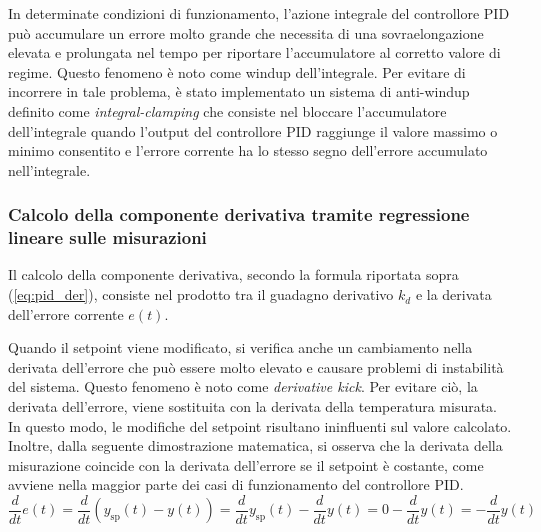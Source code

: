 In determinate condizioni di funzionamento, l'azione integrale del controllore PID può accumulare un errore molto grande che
necessita di una sovraelongazione elevata e prolungata nel tempo per riportare l'accumulatore al corretto valore di regime.
Questo fenomeno è noto come windup dell'integrale. Per evitare di incorrere in tale problema, è stato implementato un sistema
di anti-windup definito come \textit{integral-clamping} che consiste nel bloccare l'accumulatore dell'integrale quando l'output
del controllore PID raggiunge il valore massimo o minimo consentito e l'errore corrente ha lo stesso segno dell'errore accumulato
nell'integrale. \cite{advanced_pid_control} \cite{brettbeauregard_windup}

\subsubsection{Calcolo della componente derivativa tramite regressione lineare sulle misurazioni}
Il calcolo della componente derivativa, secondo la formula riportata sopra (\autoref{eq:pid_der}), consiste nel prodotto tra il guadagno
derivativo \(k_d\) e la derivata dell'errore corrente \(e(t)\).

Quando il setpoint viene modificato, si verifica anche un cambiamento nella derivata dell'errore che può essere molto elevato e causare
problemi di instabilità del sistema. Questo fenomeno è noto come \textit{derivative kick}. Per evitare ciò, la derivata dell'errore, viene
sostituita con la derivata della temperatura misurata. In questo modo, le modifiche del setpoint risultano ininfluenti sul valore calcolato.
Inoltre, dalla seguente dimostrazione matematica, si osserva che la derivata della misurazione coincide con la derivata dell'errore se il
setpoint è costante, come avviene nella maggior parte dei casi di funzionamento del controllore PID. \cite{advanced_pid_control}
\cite{brettbeauregard_derivative_kick}
\begin{equation}
	\frac{d}{dt} e(t) = \frac{d}{dt} \left(y_\text{sp}(t) - y(t) \right) = \frac{d}{dt} y_\text{sp}(t) - \frac{d}{dt} y(t) = 0 - \frac{d}{dt} y(t) = - \frac{d}{dt} y(t)
\end{equation}

